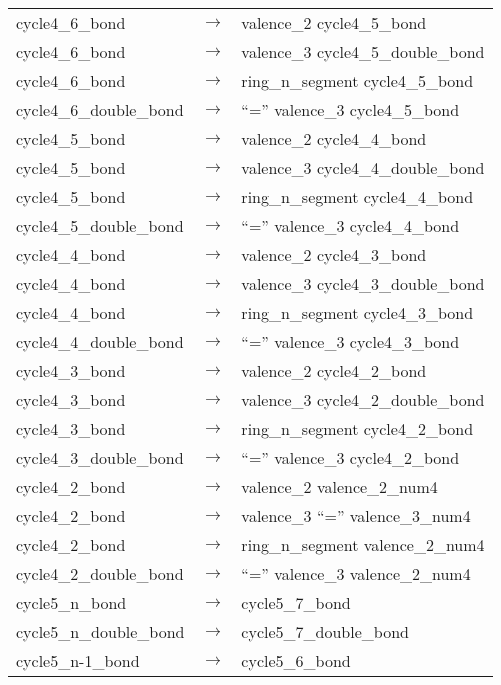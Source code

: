 \documentclass[../Document.tex]{subfiles}
\begin{document}
\begin{longtable}{m{} p{} p{}}
    cycle4\_6\_bond & $\rightarrow$ & valence\_2 cycle4\_5\_bond \\
    cycle4\_6\_bond & $\rightarrow$ & valence\_3 cycle4\_5\_double\_bond \\
    cycle4\_6\_bond & $\rightarrow$ & ring\_n\_segment cycle4\_5\_bond \\
    cycle4\_6\_double\_bond & $\rightarrow$ & ``='' valence\_3 cycle4\_5\_bond \\
    cycle4\_5\_bond & $\rightarrow$ & valence\_2 cycle4\_4\_bond \\
    cycle4\_5\_bond & $\rightarrow$ & valence\_3 cycle4\_4\_double\_bond \\
    cycle4\_5\_bond & $\rightarrow$ & ring\_n\_segment cycle4\_4\_bond \\
    cycle4\_5\_double\_bond & $\rightarrow$ & ``='' valence\_3 cycle4\_4\_bond \\
    cycle4\_4\_bond & $\rightarrow$ & valence\_2 cycle4\_3\_bond \\
    cycle4\_4\_bond & $\rightarrow$ & valence\_3 cycle4\_3\_double\_bond \\
    cycle4\_4\_bond & $\rightarrow$ & ring\_n\_segment cycle4\_3\_bond \\
    cycle4\_4\_double\_bond & $\rightarrow$ & ``='' valence\_3 cycle4\_3\_bond \\
    cycle4\_3\_bond & $\rightarrow$ & valence\_2 cycle4\_2\_bond \\
    cycle4\_3\_bond & $\rightarrow$ & valence\_3 cycle4\_2\_double\_bond \\
    cycle4\_3\_bond & $\rightarrow$ & ring\_n\_segment cycle4\_2\_bond \\
    cycle4\_3\_double\_bond & $\rightarrow$ & ``='' valence\_3 cycle4\_2\_bond \\
    cycle4\_2\_bond & $\rightarrow$ & valence\_2 valence\_2\_num4 \\
    cycle4\_2\_bond & $\rightarrow$ & valence\_3 ``='' valence\_3\_num4 \\
    cycle4\_2\_bond & $\rightarrow$ & ring\_n\_segment valence\_2\_num4 \\
    cycle4\_2\_double\_bond & $\rightarrow$ & ``='' valence\_3 valence\_2\_num4 \\
    cycle5\_n\_bond & $\rightarrow$ & cycle5\_7\_bond \\
    cycle5\_n\_double\_bond & $\rightarrow$ & cycle5\_7\_double\_bond \\
    cycle5\_n-1\_bond & $\rightarrow$ & cycle5\_6\_bond \\

\end{longtable}
\end{document}
